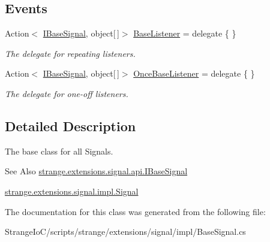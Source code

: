 \subsection*{Events}
\begin{DoxyCompactItemize}
\item 
\hypertarget{classstrange_1_1extensions_1_1signal_1_1impl_1_1_base_signal_a9cdfc483a3f28b8afdfd08b23e32d455}{Action$<$ \hyperlink{interfacestrange_1_1extensions_1_1signal_1_1api_1_1_i_base_signal}{I\-Base\-Signal}, object\mbox{[}$\,$\mbox{]}$>$ \hyperlink{classstrange_1_1extensions_1_1signal_1_1impl_1_1_base_signal_a9cdfc483a3f28b8afdfd08b23e32d455}{Base\-Listener} = delegate \{ \}}\label{classstrange_1_1extensions_1_1signal_1_1impl_1_1_base_signal_a9cdfc483a3f28b8afdfd08b23e32d455}

\begin{DoxyCompactList}\small\item\em The delegate for repeating listeners. \end{DoxyCompactList}\item 
\hypertarget{classstrange_1_1extensions_1_1signal_1_1impl_1_1_base_signal_affb58988f8dee88d610022d952d10e9b}{Action$<$ \hyperlink{interfacestrange_1_1extensions_1_1signal_1_1api_1_1_i_base_signal}{I\-Base\-Signal}, object\mbox{[}$\,$\mbox{]}$>$ \hyperlink{classstrange_1_1extensions_1_1signal_1_1impl_1_1_base_signal_affb58988f8dee88d610022d952d10e9b}{Once\-Base\-Listener} = delegate \{ \}}\label{classstrange_1_1extensions_1_1signal_1_1impl_1_1_base_signal_affb58988f8dee88d610022d952d10e9b}

\begin{DoxyCompactList}\small\item\em The delegate for one-\/off listeners. \end{DoxyCompactList}\end{DoxyCompactItemize}


\subsection{Detailed Description}
The base class for all Signals. 

\begin{DoxySeeAlso}{See Also}
\hyperlink{interfacestrange_1_1extensions_1_1signal_1_1api_1_1_i_base_signal}{strange.\-extensions.\-signal.\-api.\-I\-Base\-Signal} 

\hyperlink{classstrange_1_1extensions_1_1signal_1_1impl_1_1_signal}{strange.\-extensions.\-signal.\-impl.\-Signal} 
\end{DoxySeeAlso}


The documentation for this class was generated from the following file\-:\begin{DoxyCompactItemize}
\item 
Strange\-Io\-C/scripts/strange/extensions/signal/impl/Base\-Signal.\-cs\end{DoxyCompactItemize}

